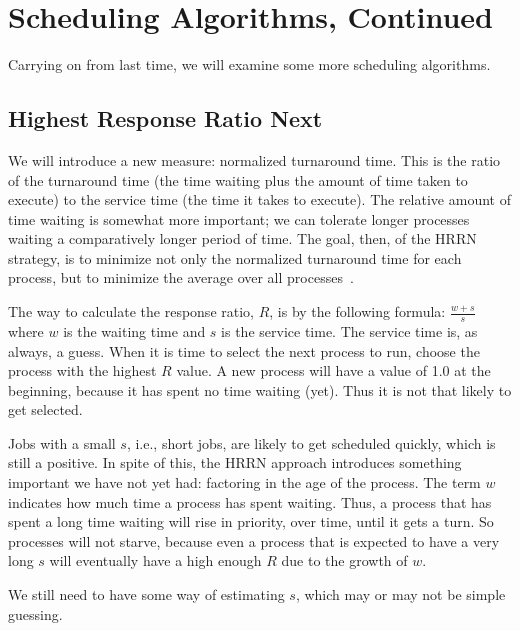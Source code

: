 




\section*{Scheduling Algorithms, Continued}

Carrying on from last time, we will examine some more scheduling algorithms.

\subsection*{Highest Response Ratio Next}

We will introduce a new measure: normalized turnaround time. This is the ratio of the turnaround time (the time waiting plus the amount of time taken to execute) to the service time (the time it takes to execute). The relative amount of time waiting is somewhat more important; we can tolerate longer processes waiting a comparatively longer period of time. The goal, then, of the HRRN strategy, is to minimize not only the normalized turnaround time for each process, but to minimize the average over all processes~\cite{osi}.

The way to calculate the response ratio, $R$, is by the following formula: $\frac{w + s}{s}$ where $w$ is the waiting time and $s$ is the service time. The service time is, as always, a guess. When it is time to select the next process to run, choose the process with the highest $R$ value. A new process will have a value of 1.0 at the beginning, because it has spent no time waiting (yet). Thus it is not that likely to get selected.

Jobs with a small $s$, i.e., short jobs, are likely to get scheduled quickly, which is still a positive. In spite of this, the HRRN approach introduces something important we have not yet had: factoring in the age of the process. The term $w$ indicates how much time a process has spent waiting. Thus, a process that has spent a long time waiting will rise in priority, over time, until it gets a turn. So processes will not starve, because even a process that is expected to have a very long $s$ will eventually have a high enough $R$ due to the growth of $w$.

We still need to have some way of estimating $s$, which may or may not be simple guessing. 

